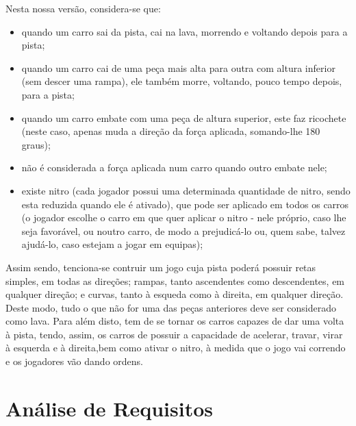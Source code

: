 \documentclass[a4paper]{report} %
\begin{document}
  \hspace{1cm}

  \par \noindent Nesta nossa versão, considera-se que:
  
  \begin{itemize}
  
  \item quando um carro sai da pista, cai na lava, morrendo e voltando depois para a pista;
  \item quando um carro cai de uma peça mais alta para outra com altura inferior (sem descer uma rampa), ele também morre, voltando, pouco tempo depois, para a pista;
  \item quando um carro embate com uma peça de altura superior, este faz ricochete (neste caso, apenas muda a direção da força aplicada, somando-lhe 180 graus);
  \item não é considerada a força aplicada num carro quando outro embate nele;
  \item existe nitro (cada jogador possui uma determinada quantidade de nitro, sendo esta reduzida quando ele é ativado), que pode ser aplicado em todos os carros (o jogador escolhe o carro em que quer aplicar o nitro - nele próprio, caso lhe seja favorável, ou noutro carro, de modo a prejudicá-lo ou, quem sabe, talvez ajudá-lo, caso estejam a jogar em equipas);
   
  \end{itemize}
  
  \hspace{1cm}
  
  \par \noindent Assim sendo, tenciona-se contruir um jogo cuja pista poderá possuir retas simples, em todas as direções; rampas, tanto ascendentes como descendentes, em qualquer direção; e curvas, tanto à esqueda como à direita, em qualquer direção. Deste modo, tudo o que não for uma das peças anteriores deve ser considerado como lava. Para além disto, tem de se tornar os carros capazes de dar uma volta à pista, tendo, assim, os carros de possuir a capacidade de acelerar, travar, virar à esquerda e à direita,bem como ativar o nitro, à medida que o jogo vai correndo e os jogadores vão dando ordens.
 




\chapter{Análise de Requisitos}
\end{document}
